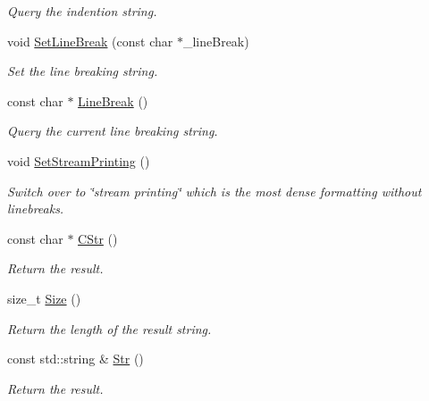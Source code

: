 \begin{DoxyCompactItemize}
\begin{DoxyCompactList}\small\item\em Query the indention string. \end{DoxyCompactList}\item 
void \hyperlink{class_ti_xml_printer_a4be1e37e69e3858c59635aa947174fe6}{Set\+Line\+Break} (const char $\ast$\+\_\+line\+Break)
\begin{DoxyCompactList}\small\item\em Set the line breaking string. \end{DoxyCompactList}\item 
const char $\ast$ \hyperlink{class_ti_xml_printer_a11f1b4804a460b175ec244eb5724d96d}{Line\+Break} ()\hypertarget{class_ti_xml_printer_a11f1b4804a460b175ec244eb5724d96d}{}\label{class_ti_xml_printer_a11f1b4804a460b175ec244eb5724d96d}

\begin{DoxyCompactList}\small\item\em Query the current line breaking string. \end{DoxyCompactList}\item 
void \hyperlink{class_ti_xml_printer_ab23a90629e374cb1cadca090468bbd19}{Set\+Stream\+Printing} ()
\begin{DoxyCompactList}\small\item\em Switch over to \char`\"{}stream printing\char`\"{} which is the most dense formatting without linebreaks. \end{DoxyCompactList}\item 
const char $\ast$ \hyperlink{class_ti_xml_printer_a859eede9597d3e0355b77757be48735e}{C\+Str} ()\hypertarget{class_ti_xml_printer_a859eede9597d3e0355b77757be48735e}{}\label{class_ti_xml_printer_a859eede9597d3e0355b77757be48735e}

\begin{DoxyCompactList}\small\item\em Return the result. \end{DoxyCompactList}\item 
size\+\_\+t \hyperlink{class_ti_xml_printer_ad01375ae9199bd2f48252eaddce3039d}{Size} ()\hypertarget{class_ti_xml_printer_ad01375ae9199bd2f48252eaddce3039d}{}\label{class_ti_xml_printer_ad01375ae9199bd2f48252eaddce3039d}

\begin{DoxyCompactList}\small\item\em Return the length of the result string. \end{DoxyCompactList}\item 
const std\+::string \& \hyperlink{class_ti_xml_printer_a3bd4daf44309b41f5813a833caa0d1c9}{Str} ()\hypertarget{class_ti_xml_printer_a3bd4daf44309b41f5813a833caa0d1c9}{}\label{class_ti_xml_printer_a3bd4daf44309b41f5813a833caa0d1c9}

\begin{DoxyCompactList}\small\item\em Return the result. \end{DoxyCompactList}\end{DoxyCompactItemize}


